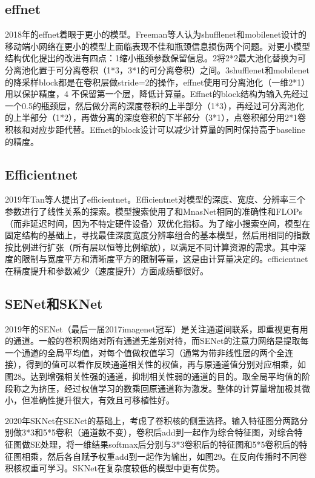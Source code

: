 \documentclass[15pt]{article}
\begin{document}
\subsection{effnet}
2018年的effnet着眼于更小的模型。Freeman等人认为shufflenet和mobilenet设计的移动端小网络在更小的模型上面临表现不佳和瓶颈信息损伤两个问题。对更小模型结构优化提出的改进有四点：1缩小瓶颈参数保留信息。2将2*2最大池化替换为可分离池化置于可分离卷积（1*3，3*1的可分离卷积）之间。3shufflenet和mobilenet的降采样block都是在卷积层做stride=2的操作，effnet使用可分离池化（一维2*1）用以保护精度，4 不保留第一个层，降低计算量。Effnet的block结构为输入先经过一个0.5的瓶颈层，然后做分离的深度卷积的上半部分（1*3），再经过可分离池化的上半部分（1*2），再做分离的深度卷积的下半部分（3*1），点卷积部分用2*1卷积核和对应步距代替。Effnet的block设计可以减少计算量的同时保持高于baseline的精度。

\subsection{Efficientnet}
2019年Tan等人提出了efficientnet。Efficientnet对模型的深度、宽度、分辨率三个参数进行了线性关系的探索。模型搜索使用了和MnasNet相同的准确性和FLOPs（而非延迟时间，因为不特定硬件设备）双优化指标。为了缩小搜索空间，模型在固定结构的基础上，寻找最佳深度宽度分辨率组合的基本模型，然后用相同的指数按比例进行扩张（所有层以恒等比例缩放），以满足不同计算资源的需求。其中深度的限制与宽度平方和清晰度平方的限制等量，这是由计算量决定的。efficientnet在精度提升和参数减少（速度提升）方面成绩都很好。

\subsection{SENet和SKNet}
2019年的SENet（最后一届2017imagenet冠军）是关注通道间联系，即重视更有用的通道。一般的卷积网络对所有通道无差别对待，而SENet的注意力网络是提取每一个通道的全局平均值，对每个值做权值学习（通常为带非线性层的两个全连接），得到的值可以看作反映通道相关性的权值，再与原通道值分别对应相乘，如图28。达到增强相关性强的通道，抑制相关性弱的通道的目的。取全局平均值的阶段称之为挤压，经过权值学习的数乘回原通道称为激发。整体的计算量增加极其微小，但准确性提升很大，有效且可移植性好。

2020年SKNet在SENet的基础上，考虑了卷积核的侧重选择。输入特征图分两路分别做3*3和5*5卷积（通道数不变），卷积后add到一起作为综合特征图，对综合特征图做SE处理，将一维结果softmax后分别与3*3卷积后的特征图和5*5卷积后的特征图相乘，然后各自赋予权重add到一起作为输出，如图29。在反向传播时不同卷积核权重可学习。SKNet在复杂度较低的模型中更有优势。
\end{document}
